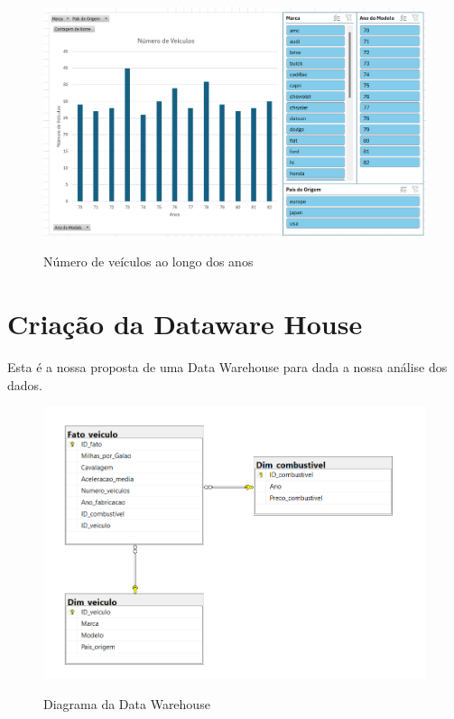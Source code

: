 \documentclass[a4paper]{article}
\begin{document}
\begin{figure}[h!]
    \centering
    \includegraphics[width=1\textwidth]{Recursos/NVeiculosGrafico.png} %
    \vspace{0.5cm}
    \label{fig:nveig}
    \caption{Número de veículos ao longo dos anos}
\end{figure}
\newpage
\section{Criação da Dataware House}\label{dwh}
Esta é a nossa proposta de uma Data Warehouse para dada a nossa análise dos dados.

\begin{figure}[h!]
    \centering
    \includegraphics[width=1\textwidth]{Recursos/DiagramaCrisePetroleo.png} %
    \vspace{0.5cm}
    \label{fig:dcri}
    \caption{Diagrama da Data Warehouse}
\end{figure}
\newpage
\end{document}

